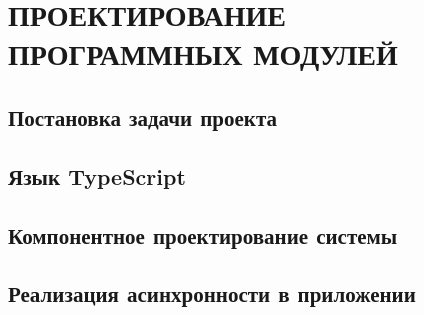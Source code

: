 \section{ПРОЕКТИРОВАНИЕ ПРОГРАММНЫХ МОДУЛЕЙ}
\label{sec:theory}

\subsection{Постановка задачи проекта}
\label{sub:theory:goals}


\subsection{Язык TypeScript}
\label{sub:theory:typescript}


\subsection{Компонентное проектирование системы}
\label{sub:theory:components}


\subsection{Реализация асинхронности в приложении}
\label{sub:theory:promise}
